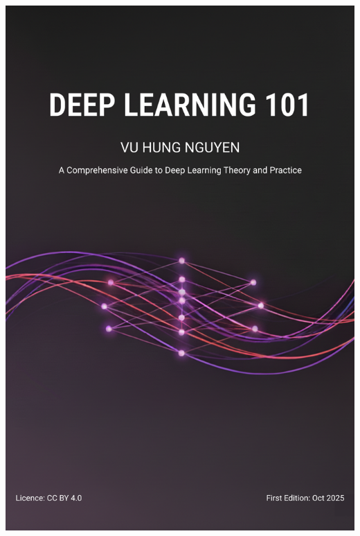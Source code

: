 \documentclass[10pt,\papersize,twoside,openright]{book}
\theoremstyle{definition}
\theoremstyle{remark}
\begin{document}
{{{{{{{{                \includegraphics[width=\paperwidth,height=\paperheight]{images/DeepLearning101-cover-trade.png}%
              }{%
}}}}}}}}
\end{document}
